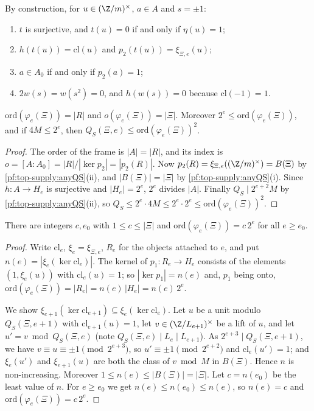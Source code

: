 By construction, for $u\in(\Z/m)^\times$, $a\in A$ and $s=\pm1$:
\begin{enumerate}[label=(F\arabic*),leftmargin=*]
\item $t$ is surjective, and $t(u)=0$ if and only if $\eta(u)=1$;
\item $h(t(u))=\mathrm{cl}(u)$ and $p_2(t(u))=\xi_{\Xi,e}(u)$;
\item $a\in A_0$ if and only if $p_2(a)=1$;
\item $2w(s)=w(s^2)=0$, and $h(w(s))=0$ because $\mathrm{cl}(-1)=1$.
\end{enumerate}

\begin{lemma}\label{pf:top-supply:anyorder}
$\mathrm{ord}(\varphi_e(\Xi))=|R|$ and $o(\varphi_e(\Xi))=|\Xi|$. Moreover $2^e\le\mathrm{ord}(\varphi_e(\Xi))$, and if
$4M\le2^e$, then $Q_S(\Xi,e)\le\mathrm{ord}(\varphi_e(\Xi))^2$.
  
 
\end{lemma}

\begin{proof}
The order of the frame is $|A|=|R|$, and its index is $o=[A:A_0]=|R|/|\ker p_2|=|p_2(R)|$. Now
$p_2(R)=\xi_{\Xi,e}((\Z/m)^\times)=B(\Xi)$ by \cref{pf:top-supply:anyQS}(ii), and $|B(\Xi)|=|\Xi|$ by
\cref{pf:top-supply:anyQS}(i). Since $h:A\to H_e$ is surjective and $|H_e|=2^e$, $2^e$ divides $|A|$. Finally
$Q_S\mid2^{e+2}M$ by \cref{pf:top-supply:anyQS}(ii), so $Q_S\le2^e\cdot4M\le2^e\cdot2^e\le\mathrm{ord}(\varphi_e(\Xi))^2$.
\end{proof}

\begin{lemma}\label{pf:top-supply:ordany}
There are integers $c,e_0$ with $1\le c\le|\Xi|$ and $\mathrm{ord}(\varphi_e(\Xi))=c\,2^e$ for all $e\ge e_0$.
\end{lemma}

\begin{proof}
Write $\mathrm{cl}_e$, $\xi_e=\xi_{\Xi,e}$, $R_e$ for the objects attached to $e$, and put $n(e)=|\xi_e(\ker\mathrm{cl}_e)|$.
The kernel of $p_1:R_e\to H_e$ consists of the elements $(1,\xi_e(u))$ with $\mathrm{cl}_e(u)=1$; so $|\ker p_1|=n(e)$ and,
$p_1$ being onto, $\mathrm{ord}(\varphi_e(\Xi))=|R_e|=n(e)\,|H_e|=n(e)\,2^e$.

We show $\xi_{e+1}(\ker\mathrm{cl}_{e+1})\subseteq\xi_e(\ker\mathrm{cl}_e)$. Let $u$ be a unit modulo $Q_S(\Xi,e+1)$ with
$\mathrm{cl}_{e+1}(u)=1$, let $v\in(\Z/L_{e+1})^\times$ be a lift of $u$, and let $u'=v\bmod Q_S(\Xi,e)$ (note
$Q_S(\Xi,e)\mid L_e\mid L_{e+1}$). As $2^{e+3}\mid Q_S(\Xi,e+1)$, we have $v\equiv u\equiv\pm1\pmod{2^{e+3}}$, so
$u'\equiv\pm1\pmod{2^{e+2}}$ and $\mathrm{cl}_e(u')=1$; and $\xi_e(u')$ and $\xi_{e+1}(u)$ are both the class of
$v\bmod M$ in $B(\Xi)$. Hence $n$ is non-increasing. Moreover $1\le n(e)\le|B(\Xi)|=|\Xi|$. Let $c=n(e_0)$ be the least
value of $n$. For $e\ge e_0$ we get $n(e)\le n(e_0)\le n(e)$, so $n(e)=c$ and $\mathrm{ord}(\varphi_e(\Xi))=c\,2^e$.
\end{proof}


